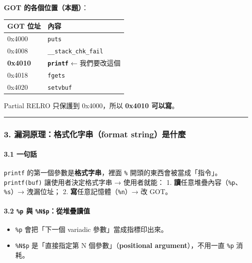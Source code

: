 \documentclass[10pt,a4paper]{article}
\newcounter{none}
\providecommand{\tightlist}{%
  \setlength{\itemsep}{0pt}\setlength{\parskip}{0pt}}
\begin{document}
\textbf{GOT 的各個位置（本題）}：

{\def\LTcaptype{none} %
\begin{longtable}[]{@{}ll@{}}
\toprule\noalign{}
GOT 位址 & 內容 \\
\midrule\noalign{}
\endhead
\bottomrule\noalign{}
\endlastfoot
0x4000 & \texttt{puts} \\
0x4008 & \texttt{\_\allowbreak{}\_\allowbreak{}stack\_\allowbreak{}chk\_\allowbreak{}fail} \\
\textbf{0x4010} & \textbf{\texttt{printf}} ← 我們要改這個 \\
0x4018 & \texttt{fgets} \\
0x4020 & \texttt{setvbuf} \\
\end{longtable}
}

Partial RELRO 只保護到 0x4000，所以 \textbf{0x4010 可以寫}。

\begin{center}\rule{0.5\linewidth}{0.5pt}\end{center}

\subsubsection{3. 漏洞原理：格式化字串（format
string）是什麼}\label{ux6f0fux6d1eux539fux7406ux683cux5f0fux5316ux5b57ux4e32format-stringux662fux4ec0ux9ebc}

\paragraph{3.1 一句話}\label{ux4e00ux53e5ux8a71}

\texttt{printf} 的第一個參數是\textbf{格式字串}，裡面 \texttt{\%\allowbreak{}}
開頭的東西會被當成「指令」。 \texttt{printf(buf)} 讓使用者決定格式字串 →
使用者就能： 1. \textbf{讀}任意堆疊內容（\texttt{\%\allowbreak{}p}、\texttt{\%\allowbreak{}s}）→
洩漏位址； 2. \textbf{寫}任意記憶體（\texttt{\%\allowbreak{}n}）→ 改 GOT。

\paragraph{\texorpdfstring{3.2 \texttt{\%\allowbreak{}p} 與
\texttt{\%\allowbreak{}N\$\allowbreak{}p}：從堆疊讀值}{3.2 \%p 與 \%N\$p：從堆疊讀值}}\label{p-ux8207-npux5f9eux5806ux758aux8b80ux503c}

\begin{itemize}
\tightlist
\item
  \texttt{\%\allowbreak{}p} 會把「下一個 variadic 參數」當成指標印出來。
\item
  \texttt{\%\allowbreak{}N\$\allowbreak{}p} 是「直接指定第 N 個參數」（\textbf{positional
  argument}），不用一直 \texttt{\%\allowbreak{}p} 消耗。
\end{itemize}
\end{document}
